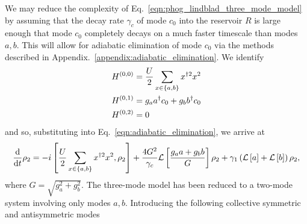 We may reduce the complexity of Eq.~\ref{eqn:phog_lindblad_three_mode_model} by assuming that the decay rate $\gamma_c$ of mode $c_0$ into the reservoir $R$ is large enough that mode $c_0$ completely decays on a much faster timescale than modes $a, b$. This will allow for adiabatic elimination of mode $c_0$ via the methods described in Appendix.~\ref{appendix:adiabatic_elimination}. We identify
\begin{align}
&H^{\left(0, 0\right)} = \frac{U}{2} \sum_{x \in \left\{a, b\right\}} x^{\dagger 2} x^2 \notag \\
%
&H^{\left(0, 1\right)} = g_a a^\dagger c_0 + g_b b^\dagger c_0 \notag \\
%
&H^{\left(0, 2\right)} = 0
\end{align}
and so, substituting into Eq.~\ref{eqn:adiabatic_elimination}, we arrive at
\begin{equation}\label{eqn:phog_two_mode_model_deriv}
\frac{\mathrm{d}}{\mathrm{d}t} \rho_2 = - i \left[\frac{U}{2} \sum_{x \in \left\{a, b\right\}} x^{\dagger 2} x^2, \rho_2\right] + \frac{4 G^2}{\gamma_c} \mathcal{L}\left[\frac{g_a a + g_b b}{G} \right]\rho_2 + \gamma_1 \left(\mathcal{L}\left[a\right] + \mathcal{L}\left[b\right]\right)\rho_2,
\end{equation}
where $G = \sqrt{g_a^2 + g_b^2}$. The three-mode model has been reduced to a two-mode system involving only modes $a, b$. Introducing the following collective symmetric and antisymmetric modes

